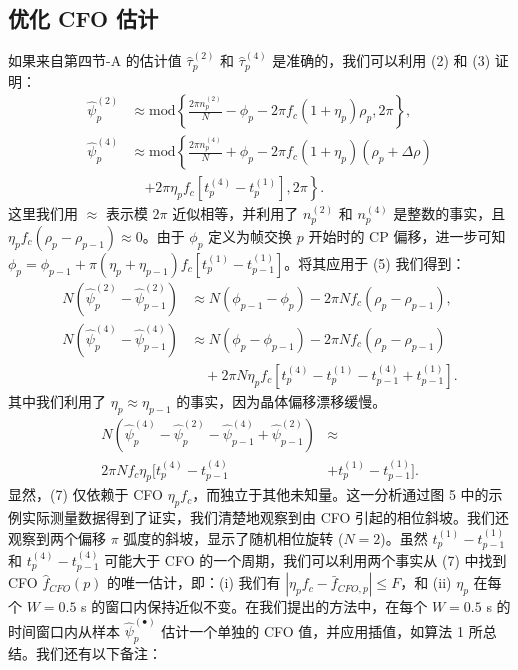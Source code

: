 \documentclass[journal]{IEEEtran}
\begin{document}
\subsection{优化 CFO 估计}
如果来自第四节-A 的估计值 $\hat{\tau}_p^{(2)}$ 和 $\hat{\tau}_p^{(4)}$ 是准确的，我们可以利用 (2) 和 (3) 证明：
\begin{align}
\hat{\psi}_p^{(2)} &\approx \text{mod} \left\{ \frac{2\pi n_p^{(2)}}{N} - \phi_p - 2\pi f_c(1+\eta_p)\rho_p, 2\pi \right\}, \label{eq:5a} \\
\hat{\psi}_p^{(4)} &\approx \text{mod} \left\{ \frac{2\pi n_p^{(4)}}{N} + \phi_p - 2\pi f_c(1+\eta_p)(\rho_p+\Delta\rho) \right. \nonumber \\
&\quad \left. + 2\pi \eta_p f_c [t_p^{(4)} - t_p^{(1)}], 2\pi \right\}. \label{eq:5b}
\end{align}
这里我们用 $\approx$ 表示模 $2\pi$ 近似相等，并利用了 $n_p^{(2)}$ 和 $n_p^{(4)}$ 是整数的事实，且 $\eta_p f_c (\rho_p - \rho_{p-1}) \approx 0$。由于 $\phi_p$ 定义为帧交换 $p$ 开始时的 CP 偏移，进一步可知 $\phi_p = \phi_{p-1} + \pi (\eta_p + \eta_{p-1}) f_c [t_p^{(1)} - t_{p-1}^{(1)}]$。将其应用于 (5) 我们得到：
\begin{align}
N(\hat{\psi}_p^{(2)} - \hat{\psi}_{p-1}^{(2)}) &\approx N(\phi_{p-1} - \phi_p) - 2\pi N f_c (\rho_p - \rho_{p-1}), \label{eq:6a} \\
N(\hat{\psi}_p^{(4)} - \hat{\psi}_{p-1}^{(4)}) &\approx N(\phi_p - \phi_{p-1}) - 2\pi N f_c (\rho_p - \rho_{p-1}) \nonumber \\
&\quad + 2\pi N \eta_p f_c [t_p^{(4)} - t_p^{(1)} - t_{p-1}^{(4)} + t_{p-1}^{(1)}]. \label{eq:6b}
\end{align}
其中我们利用了 $\eta_p \approx \eta_{p-1}$ 的事实，因为晶体偏移漂移缓慢。
\begin{equation}
\begin{split}
N(\hat{\psi}_p^{(4)} - \hat{\psi}_p^{(2)} - \hat{\psi}_{p-1}^{(4)} + \hat{\psi}_{p-1}^{(2)}) &\approx \\
2\pi N f_c \eta_p [t_p^{(4)} - t_{p-1}^{(4)} &+ t_p^{(1)} - t_{p-1}^{(1)}].
\end{split} \label{eq:7}
\end{equation}
显然，(7) 仅依赖于 CFO $\eta_p f_c$，而独立于其他未知量。这一分析通过图 5 中的示例实际测量数据得到了证实，我们清楚地观察到由 CFO 引起的相位斜坡。我们还观察到两个偏移 $\pi$ 弧度的斜坡，显示了随机相位旋转 ($N=2$)。虽然 $t_p^{(1)} - t_{p-1}^{(1)}$ 和 $t_p^{(4)} - t_{p-1}^{(4)}$ 可能大于 CFO 的一个周期，我们可以利用两个事实从 (7) 中找到 CFO $\hat{f}_{CFO}(p)$ 的唯一估计，即：(i) 我们有 $|\eta_p f_c - \bar{f}_{CFO,p}| \le F$，和 (ii) $\eta_p$ 在每个 $W=0.5$ s 的窗口内保持近似不变。在我们提出的方法中，在每个 $W=0.5$ s 的时间窗口内从样本 $\hat{\psi}_p^{(\bullet)}$ 估计一个单独的 CFO 值，并应用插值，如算法 1 所总结。我们还有以下备注：
\end{document}
